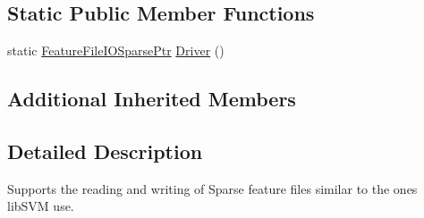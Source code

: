 \subsection*{Static Public Member Functions}
\begin{DoxyCompactItemize}
\item 
static \hyperlink{class_k_k_m_l_l_1_1_feature_file_i_o_sparse_ae523542dd0794ca562fa18b9db490f29}{Feature\+File\+I\+O\+Sparse\+Ptr} \hyperlink{class_k_k_m_l_l_1_1_feature_file_i_o_sparse_a07c936fb1a46479ad28be523bfaac60b}{Driver} ()
\end{DoxyCompactItemize}
\subsection*{Additional Inherited Members}


\subsection{Detailed Description}
Supports the reading and writing of Sparse feature files similar to the ones lib\+S\+VM use. 


